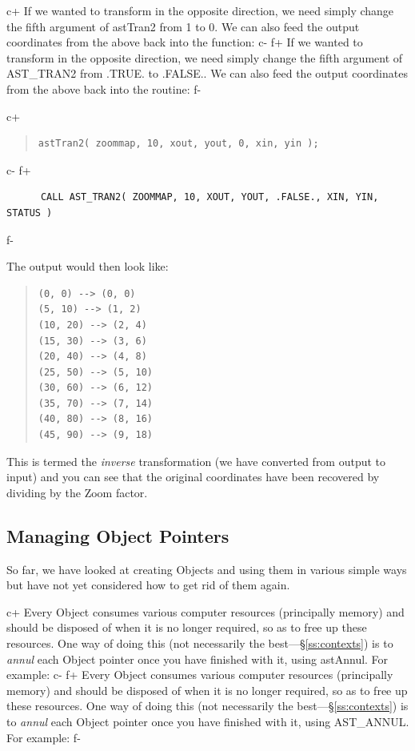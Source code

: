 \documentclass[twoside,11pt]{article}
\newcommand{\secref}[1]{\S\ref{#1}}
\newcommand{\secref}[1]{\ref{#1}}
\begin{document}
c+
If we wanted to transform in the opposite direction, we need simply
change the fifth argument of astTran2 from 1 to 0. We can also feed
the output coordinates from the above back into the function:
c-
f+
If we wanted to transform in the opposite direction, we need simply
change the fifth argument of AST\_TRAN2 from .TRUE. to .FALSE.. We can
also feed the output coordinates from the above back into the routine:
f-

c+
\begin{quote}
\small
\begin{verbatim}
astTran2( zoommap, 10, xout, yout, 0, xin, yin );
\end{verbatim}
\normalsize
\end{quote}
c-
f+
\small
\begin{verbatim}
      CALL AST_TRAN2( ZOOMMAP, 10, XOUT, YOUT, .FALSE., XIN, YIN, STATUS )
\end{verbatim}
\normalsize
f-

The output would then look like:

\begin{quote}
\small
\begin{verbatim}
(0, 0) --> (0, 0)
(5, 10) --> (1, 2)
(10, 20) --> (2, 4)
(15, 30) --> (3, 6)
(20, 40) --> (4, 8)
(25, 50) --> (5, 10)
(30, 60) --> (6, 12)
(35, 70) --> (7, 14)
(40, 80) --> (8, 16)
(45, 90) --> (9, 18)
\end{verbatim}
\normalsize
\end{quote}

This is termed the {\em{inverse}} transformation (we have converted
from output to input) and you can see that the original coordinates
have been recovered by dividing by the Zoom factor.

\subsection{\label{ss:annullingpointers}Managing Object Pointers}

So far, we have looked at creating Objects and using them in various
simple ways but have not yet considered how to get rid of them again.

c+
Every Object consumes various computer resources (principally memory)
and should be disposed of when it is no longer required, so as to free
up these resources. One way of doing this (not necessarily the
best---\secref{ss:contexts}) is to {\em{annul}} each Object pointer once
you have finished with it, using astAnnul. For example:
c-
f+
Every Object consumes various computer resources (principally memory)
and should be disposed of when it is no longer required, so as to free
up these resources. One way of doing this (not necessarily the
best---\secref{ss:contexts}) is to {\em{annul}} each Object pointer once
you have finished with it, using AST\_ANNUL. For example:
f-
\end{document}

